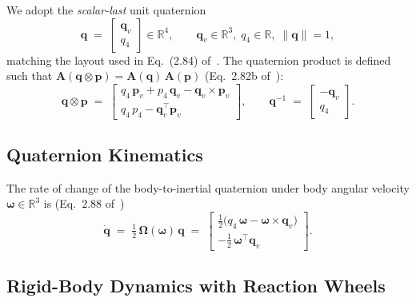 We adopt the \emph{scalar-last} unit quaternion
\begin{equation}
\bm{q} \;=\; \begin{bmatrix} \bm{q}_v \\ q_4 \end{bmatrix} \in \mathbb{R}^{4},
\qquad \bm{q}_v \in \mathbb{R}^{3},\; q_4 \in \mathbb{R},\; \|\bm{q}\| = 1,
\label{eq:scalar-last-q}
\end{equation}
matching the layout used in Eq.~(2.84) of~\cite{markley2014}. The
quaternion product is defined such that
$\bm{A}(\bm{q}\otimes\bm{p}) = \bm{A}(\bm{q})\,\bm{A}(\bm{p})$
(Eq.~2.82b of~\cite{markley2014}):
\begin{equation}
\bm{q}\otimes\bm{p} \;=\;
\begin{bmatrix}
 q_4\,\bm{p}_v + p_4\,\bm{q}_v - \bm{q}_v\times\bm{p}_v \\[2pt]
 q_4\,p_4 - \bm{q}_v^{\!\top}\bm{p}_v
\end{bmatrix},
\qquad
\bm{q}^{-1} \;=\; \begin{bmatrix} -\bm{q}_v \\ q_4 \end{bmatrix}.
\end{equation}


\subsection{Quaternion Kinematics}
\label{sec:quat-kinematics}

The rate of change of the body-to-inertial quaternion under body angular
velocity $\bm{\omega}\in\mathbb{R}^{3}$ is
(Eq.~2.88 of~\cite{markley2014})
\begin{equation}
\dot{\bm{q}}
\;=\; \tfrac{1}{2}\,\bm{\Omega}(\bm{\omega})\,\bm{q}
\;=\;
\begin{bmatrix}
 \tfrac{1}{2}\bigl(q_4\,\bm{\omega} - \bm{\omega}\times\bm{q}_v\bigr) \\[3pt]
-\tfrac{1}{2}\,\bm{\omega}^{\!\top}\bm{q}_v
\end{bmatrix}.
\label{eq:quat-kin}
\end{equation}


\subsection{Rigid-Body Dynamics with Reaction Wheels}
\label{sec:euler-wheels}

